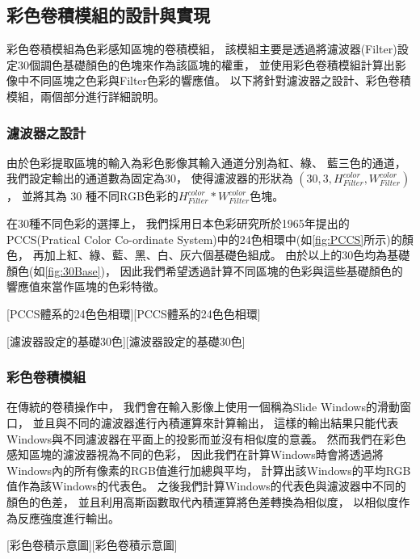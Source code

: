 \documentclass[class=NCU_thesis, crop=false]{standalone}
\begin{document}
	\subsection{彩色卷積模組的設計與實現}
		彩色卷積模組為色彩感知區塊的卷積模組，
		該模組主要是透過將濾波器(Filter)設定30個調色基礎顏色的色塊來作為該區塊的權重，
		並使用彩色卷積模組計算出影像中不同區塊之色彩與Filter色彩的響應值。
		以下將針對濾波器之設計、彩色卷積模組，兩個部分進行詳細說明。
		
		\subsubsection{濾波器之設計}
			由於色彩提取區塊的輸入為彩色影像其輸入通道分別為紅、綠、 藍三色的通道，
			我們設定輸出的通道數為固定為30，
			使得濾波器的形狀為 $\left(30 , 3, H^{color}_{Filter},  W^{color}_{Filter} \right)$，
			並將其為 30 種不同RGB色彩的$H^{color}_{Filter} * W^{color}_{Filter}$色塊。

			在30種不同色彩的選擇上，
			我們採用日本色彩研究所於1965年提出的PCCS(Pratical Color Co-ordinate System)中的24色相環中(如\cref{fig:PCCS}所示)的顏色，
			再加上紅、綠、藍、黑、白、灰六個基礎色組成。
			由於以上的30色均為基礎顏色(如\cref{fig:30Base})，
			因此我們希望透過計算不同區塊的色彩與這些基礎顏色的響應值來當作區塊的色彩特徵。

			[PCCS體系的24色色相環\cite{PCCScite}][PCCS體系的24色色相環]

			[濾波器設定的基礎30色][濾波器設定的基礎30色]

		\subsubsection{彩色卷積模組}
			在傳統的卷積操作中，
			我們會在輸入影像上使用一個稱為Slide Windows的滑動窗口，
			並且與不同的濾波器進行內積運算來計算輸出，
			這樣的輸出結果只能代表Windows與不同濾波器在平面上的投影而並沒有相似度的意義。
			然而我們在彩色感知區塊的濾波器視為不同的色彩，
			因此我們在計算Windows時會將透過將Windows內的所有像素的RGB值進行加總與平均，
			計算出該Windows的平均RGB值作為該Windows的代表色。
			之後我們計算Windows的代表色與濾波器中不同的顏色的色差，
			並且利用高斯函數取代內積運算將色差轉換為相似度，
			以相似度作為反應強度進行輸出。

			[彩色卷積示意圖]
\end{document}
